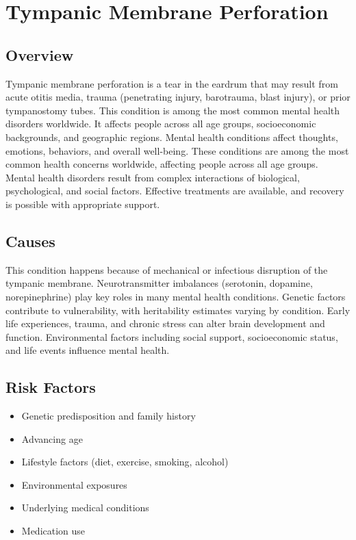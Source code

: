 \chapter{Tympanic Membrane Perforation}
\label{sec:Tympanic Membrane Perforation}

\section{Overview}
Tympanic membrane perforation is a tear in the eardrum that may result from acute otitis media, trauma (penetrating injury, barotrauma, blast injury), or prior tympanostomy tubes. This condition is among the most common mental health disorders worldwide. It affects people across all age groups, socioeconomic backgrounds, and geographic regions. Mental health conditions affect thoughts, emotions, behaviors, and overall well-being. These conditions are among the most common health concerns worldwide, affecting people across all age groups. Mental health disorders result from complex interactions of biological, psychological, and social factors. Effective treatments are available, and recovery is possible with appropriate support.
\section{Causes}
This condition happens because of mechanical or infectious disruption of the tympanic membrane.  Neurotransmitter imbalances (serotonin, dopamine, norepinephrine) play key roles in many mental health conditions. Genetic factors contribute to vulnerability, with heritability estimates varying by condition. Early life experiences, trauma, and chronic stress can alter brain development and function. Environmental factors including social support, socioeconomic status, and life events influence mental health.   
\section{Risk Factors}
\begin{itemize}[noitemsep]
  \item Genetic predisposition and family history
  \item Advancing age
  \item Lifestyle factors (diet, exercise, smoking, alcohol)
  \item Environmental exposures
  \item Underlying medical conditions
  \item Medication use
\end{itemize}
